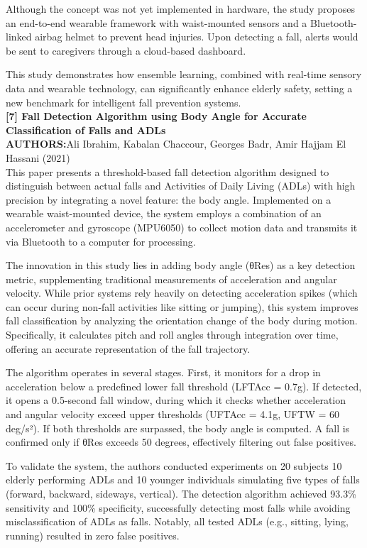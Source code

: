\documentclass[a4paper, 12pt]{report}
\begin{document}
Although the concept was not yet implemented in hardware, the study proposes an end-to-end wearable framework with waist-mounted sensors and a Bluetooth-linked airbag helmet to prevent head injuries. Upon detecting a fall, alerts would be sent to caregivers through a cloud-based dashboard.

This study demonstrates how ensemble learning, combined with real-time sensory data and wearable technology, can significantly enhance elderly safety, setting a new benchmark for intelligent fall prevention systems.\\
\noindent\textbf{[7] Fall Detection Algorithm using Body Angle for Accurate Classification of Falls and ADLs}\\
 \textbf{AUTHORS:}Ali Ibrahim, Kabalan Chaccour, Georges Badr, Amir Hajjam El Hassani (2021)\\
 This paper presents a threshold-based fall detection algorithm designed to distinguish between actual falls and Activities of Daily Living (ADLs) with high precision by integrating a novel feature: the body angle. Implemented on a wearable waist-mounted device, the system employs a combination of an accelerometer and gyroscope (MPU6050) to collect motion data and transmits it via Bluetooth to a computer for processing.
 
The innovation in this study lies in adding body angle (θRes) as a key detection metric, supplementing traditional measurements of acceleration and angular velocity. While prior systems rely heavily on detecting acceleration spikes (which can occur during non-fall activities like sitting or jumping), this system improves fall classification by analyzing the orientation change of the body during motion. Specifically, it calculates pitch and roll angles through integration over time, offering an accurate representation of the fall trajectory.

The algorithm operates in several stages. First, it monitors for a drop in acceleration below a predefined lower fall threshold (LFTAcc = 0.7g). If detected, it opens a 0.5-second fall window, during which it checks whether acceleration and angular velocity exceed upper thresholds (UFTAcc = 4.1g, UFTW = 60 deg/s²). If both thresholds are surpassed, the body angle is computed. A fall is confirmed only if θRes exceeds 50 degrees, effectively filtering out false positives.

To validate the system, the authors conducted experiments on 20 subjects 10 elderly performing ADLs and 10 younger individuals simulating five types of falls (forward, backward, sideways, vertical). The detection algorithm achieved 93.3\% sensitivity and 100\% specificity, successfully detecting most falls while avoiding misclassification of ADLs as falls. Notably, all tested ADLs (e.g., sitting, lying, running) resulted in zero false positives.
\end{document}
